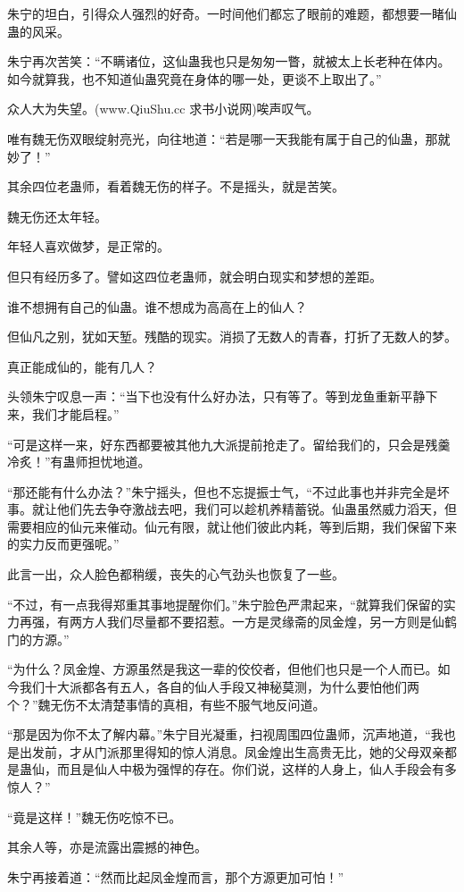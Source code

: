 \begin{this_body}
朱宁的坦白，引得众人强烈的好奇。一时间他们都忘了眼前的难题，都想要一睹仙蛊的风采。

朱宁再次苦笑：“不瞒诸位，这仙蛊我也只是匆匆一瞥，就被太上长老种在体内。如今就算我，也不知道仙蛊究竟在身体的哪一处，更谈不上取出了。”

众人大为失望。(www.QiuShu.cc 求书小说网)唉声叹气。

唯有魏无伤双眼绽射亮光，向往地道：“若是哪一天我能有属于自己的仙蛊，那就妙了！”

其余四位老蛊师，看着魏无伤的样子。不是摇头，就是苦笑。

魏无伤还太年轻。

年轻人喜欢做梦，是正常的。

但只有经历多了。譬如这四位老蛊师，就会明白现实和梦想的差距。

谁不想拥有自己的仙蛊。谁不想成为高高在上的仙人？

但仙凡之别，犹如天堑。残酷的现实。消损了无数人的青春，打折了无数人的梦。

真正能成仙的，能有几人？

头领朱宁叹息一声：“当下也没有什么好办法，只有等了。等到龙鱼重新平静下来，我们才能启程。”

“可是这样一来，好东西都要被其他九大派提前抢走了。留给我们的，只会是残羹冷炙！”有蛊师担忧地道。

“那还能有什么办法？”朱宁摇头，但也不忘提振士气，“不过此事也并非完全是坏事。就让他们先去争夺激战去吧，我们可以趁机养精蓄锐。仙蛊虽然威力滔天，但需要相应的仙元来催动。仙元有限，就让他们彼此内耗，等到后期，我们保留下来的实力反而更强呢。”

此言一出，众人脸色都稍缓，丧失的心气劲头也恢复了一些。

“不过，有一点我得郑重其事地提醒你们。”朱宁脸色严肃起来，“就算我们保留的实力再强，有两方人我们尽量都不要招惹。一方是灵缘斋的凤金煌，另一方则是仙鹤门的方源。”

“为什么？凤金煌、方源虽然是我这一辈的佼佼者，但他们也只是一个人而已。如今我们十大派都各有五人，各自的仙人手段又神秘莫测，为什么要怕他们两个？”魏无伤不太清楚事情的真相，有些不服气地反问道。

“那是因为你不太了解内幕。”朱宁目光凝重，扫视周围四位蛊师，沉声地道，“我也是出发前，才从门派那里得知的惊人消息。凤金煌出生高贵无比，她的父母双亲都是蛊仙，而且是仙人中极为强悍的存在。你们说，这样的人身上，仙人手段会有多惊人？”

“竟是这样！”魏无伤吃惊不已。

其余人等，亦是流露出震撼的神色。

朱宁再接着道：“然而比起凤金煌而言，那个方源更加可怕！”


\end{this_body}
